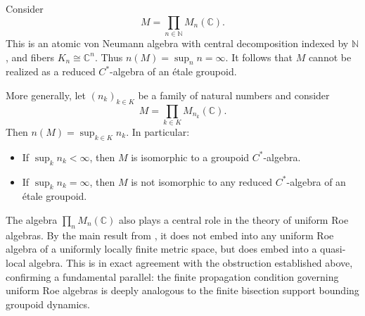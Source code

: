 \begin{example}
Consider
\[
M = \prod_{n \in \mathbb{N}} M_n(\mathbb{C}).
\]
This is an atomic von Neumann algebra with central decomposition indexed by $\mathbb{N}$, and fibers $K_n \cong \mathbb{C}^n$.
Thus $n(M) = \sup_{n} n = \infty$.
It follows that $M$ cannot be realized as a reduced $C^*$-algebra of an étale groupoid.
\end{example}

\begin{example}
More generally, let $(n_k)_{k \in K}$ be a family of natural numbers and consider
\[
M = \prod_{k \in K} M_{n_k}(\mathbb{C}).
\]
Then $n(M) = \sup_{k \in K} n_k$.
In particular:
\begin{itemize}
\item If $\sup_k n_k < \infty$, then $M$ is isomorphic to a groupoid $C^*$-algebra.
\item If $\sup_k n_k = \infty$, then $M$ is not isomorphic to any reduced $C^*$-algebra of an étale groupoid.
\end{itemize}
\end{example}

\begin{remark}
The algebra $\prod_{n} M_n(\mathbb{C})$ also plays a central role in the theory of uniform Roe algebras. 
By the main result from \cite{Ozawa2023}, it does not embed into any uniform Roe algebra of a uniformly locally finite metric space, but does embed into a quasi-local algebra. 
This is in exact agreement with the obstruction established above, confirming a fundamental parallel: the finite propagation condition governing uniform Roe algebras is deeply analogous to the finite bisection support bounding groupoid dynamics.
\end{remark}




